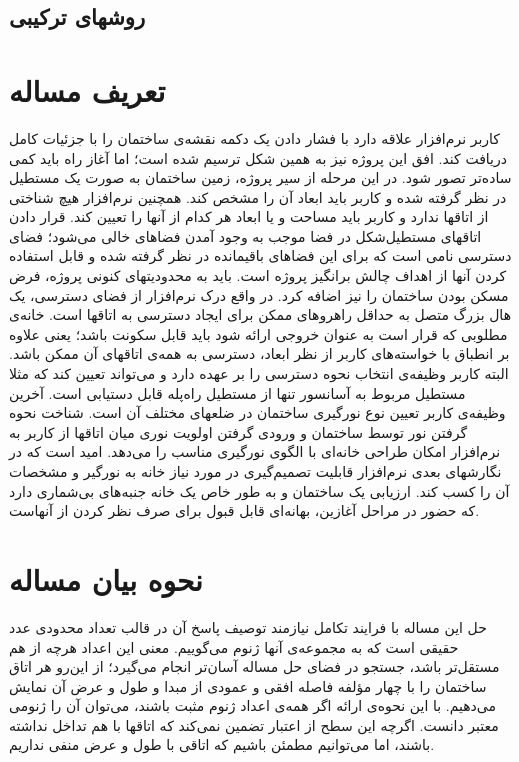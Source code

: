 \documentclass{report}
\begin{document}
\subsection{روشهای ترکیبی}

\section{تعریف مساله}
کاربر نرم‌افزار علاقه دارد با فشار دادن یک دکمه نقشه‌ی ساختمان را با جزئیات کامل دریافت کند. افق این پروژه نیز به همین شکل ترسیم شده است؛ اما آغاز راه باید کمی ساده‌تر تصور شود. در این مرحله از سیر پروژه، زمین ساختمان به صورت یک مستطیل در نظر گرفته شده و کاربر باید ابعاد آن را مشخص کند. همچنین نرم‌افزار هیچ شناختی از اتاقها ندارد و کاربر باید مساحت و یا ابعاد هر کدام از آنها را تعیین کند. قرار دادن اتاقهای مستطیل‌شکل در فضا موجب به وجود آمدن فضاهای خالی می‌شود؛ فضای دسترسی نامی است که برای این فضاهای باقیمانده در نظر گرفته شده و قابل استفاده کردن آنها از اهداف چالش برانگیز پروژه است. باید به محدودیتهای کنونی پروژه، فرض مسکن بودن ساختمان را نیز اضافه کرد. در واقع درک نرم‌افزار از فضای دسترسی، یک هال بزرگ متصل به حداقل راهروهای ممکن برای ایجاد دسترسی به اتاقها است.
خانه‌ی مطلوبی که قرار است به عنوان خروجی ارائه شود باید قابل سکونت باشد؛ یعنی علاوه بر انطباق با خواسته‌های کاربر از نظر ابعاد، دسترسی به همه‌ی اتاقهای آن ممکن باشد. البته کاربر وظیفه‌ی انتخاب نحوه دسترسی را بر عهده دارد و می‌تواند تعیین کند که مثلا مستطیل مربوط به آسانسور تنها از مستطیل راه‌پله قابل دستیابی است. 
آخرین وظیفه‌ی کاربر تعیین نوع نورگیری ساختمان در ضلعهای مختلف آن است. شناخت نحوه گرفتن نور توسط ساختمان و ورودی گرفتن اولویت نوری میان اتاقها از کاربر به نرم‌افزار امکان طراحی خانه‌ای با الگوی نورگیری مناسب را می‌دهد. امید است که در نگارشهای بعدی نرم‌افزار قابلیت تصمیم‌گیری در مورد نیاز خانه به نورگیر و مشخصات آن را کسب کند. ارزیابی یک ساختمان و به طور خاص یک خانه جنبه‌های بی‌شماری دارد که حضور در مراحل آغازین، بهانه‌ای قابل قبول برای صرف نظر کردن از آنهاست.

\section{نحوه بیان مساله}
حل این مساله با فرایند تکامل نیازمند توصیف پاسخ آن در قالب تعداد محدودی عدد حقیقی است که به مجموعه‌ی آنها ژنوم می‌گوییم. معنی این اعداد هرچه از هم مستقل‌تر باشد، جستجو در فضای حل مساله آسان‌تر انجام می‌گیرد؛ از این‌رو هر اتاق ساختمان را با چهار مؤلفه فاصله افقی و عمودی از مبدا و طول و عرض آن نمایش می‌دهیم. با این نحوه‌ی ارائه اگر همه‌ی اعداد ژنوم مثبت باشند، می‌توان آن را ژنومی معتبر دانست. اگرچه این سطح از اعتبار تضمین نمی‌کند که اتاقها با هم تداخل نداشته باشند، اما می‌توانیم مطمئن باشیم که اتاقی با طول و عرض منفی نداریم.
\end{document}
